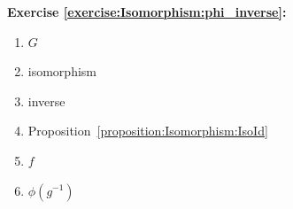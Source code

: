 \noindent\textbf{Exercise \ref{exercise:Isomorphism:phi_inverse}:}
%

\begin{multicols}{3}
\begin{enumerate}
\item
$G$

\item
isomorphism

\item
inverse

\item
Proposition~\ref{proposition:Isomorphism:IsoId}

\item
$f$

\item
$\phi(g^{-1})$
\end{enumerate}
\end{multicols}


